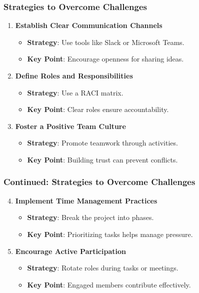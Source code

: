 \documentclass[aspectratio=169]{beamer}
\begin{document}
\begin{frame}[fragile]
    \frametitle{Strategies to Overcome Challenges}
    \begin{enumerate}
        \item \textbf{Establish Clear Communication Channels}
            \begin{itemize}
                \item \textbf{Strategy}: Use tools like Slack or Microsoft Teams.
                \item \textbf{Key Point}: Encourage openness for sharing ideas.
            \end{itemize}
        
        \item \textbf{Define Roles and Responsibilities}
            \begin{itemize}
                \item \textbf{Strategy}: Use a RACI matrix.
                \item \textbf{Key Point}: Clear roles ensure accountability.
            \end{itemize}
        
        \item \textbf{Foster a Positive Team Culture}
            \begin{itemize}
                \item \textbf{Strategy}: Promote teamwork through activities.
                \item \textbf{Key Point}: Building trust can prevent conflicts.
            \end{itemize}
    \end{enumerate}
\end{frame}

\begin{frame}[fragile]
    \frametitle{Continued: Strategies to Overcome Challenges}
    \begin{enumerate}
        \setcounter{enumi}{3}
        \item \textbf{Implement Time Management Practices}
            \begin{itemize}
                \item \textbf{Strategy}: Break the project into phases.
                \item \textbf{Key Point}: Prioritizing tasks helps manage pressure.
            \end{itemize}
        
        \item \textbf{Encourage Active Participation}
            \begin{itemize}
                \item \textbf{Strategy}: Rotate roles during tasks or meetings.
                \item \textbf{Key Point}: Engaged members contribute effectively.
            \end{itemize}
    \end{enumerate}
\end{frame}
\end{document}
